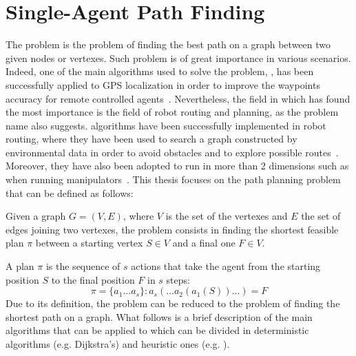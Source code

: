 \section{Single-Agent Path Finding}
\label{sec:SAPF}
The  problem is the problem of finding the best path on a graph 
between two given nodes or vertexes. Such problem is of great importance in 
various scenarios. Indeed, one of the main algorithms used to solve the 
 problem, \astar, has been successfully applied to GPS localization
in order to improve the waypoints accuracy for remote controlled 
agents~\cite{astar_gps}. Nevertheless, the field in which  has found
the most importance is the field of robot routing and planning, as the problem 
name also suggests.  algorithms have been successfully implemented
in robot routing, where they have been used to search a graph constructed by
environmental data in order to avoid obstacles and to explore possible
routes~\cite{robot_routing}. Moreover, they have also been adopted to run in
more than 2 dimensions such as when running manipulators~\cite{robot_mani}.
\newline
This thesis focuses on the path planning problem that can be defined as 
follows:
\begin{definition}
Given a graph $G = (V,E)$, where $V$ is the set of the vertexes and $E$ the set
of edges joining two vertexes, the  problem consists in finding the
shortest feasible plan $\pi$ between a starting vertex $S\in V$ and a final one 
$F\in V$. 
\end{definition}
A plan $\pi$ is the sequence of $s$ actions that take the agent from the 
starting position $S$ to the final position $F$ in $s$ steps:
\[ \pi=\{a_1...a_s\} : a_s(...a_2(a_1(S))...)=F \]
Due to its definition, the  problem can be reduced to the problem of
finding the shortest path on a graph. What follows is a brief description of
the main algorithms that can be applied to  which can be divided in
deterministic algorithms (e.g. Dijkstra's) and heuristic ones (e.g. \astar).
%
%

